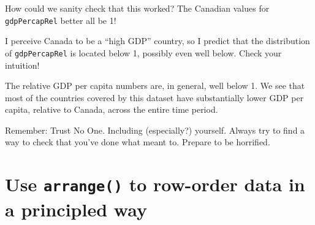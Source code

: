\documentclass[
]{book}
\newenvironment{Shaded}{\begin{snugshade}}{\end{snugshade}}
\newcommand{\CommentTok}[1]{\textcolor[rgb]{0.56,0.35,0.01}{\textit{#1}}}
\newcommand{\KeywordTok}[1]{\textcolor[rgb]{0.13,0.29,0.53}{\textbf{#1}}}
\newcommand{\NormalTok}[1]{#1}
\newcommand{\OperatorTok}[1]{\textcolor[rgb]{0.81,0.36,0.00}{\textbf{#1}}}
\newcommand{\StringTok}[1]{\textcolor[rgb]{0.31,0.60,0.02}{#1}}
\begin{document}
How could we sanity check that this worked? The Canadian values for \texttt{gdpPercapRel} better all be 1!

\begin{Shaded}
\end{Shaded}

I perceive Canada to be a ``high GDP'' country, so I predict that the distribution of \texttt{gdpPercapRel} is located below 1, possibly even well below. Check your intuition!

\begin{Shaded}
\end{Shaded}

The relative GDP per capita numbers are, in general, well below 1. We see that most of the countries covered by this dataset have substantially lower GDP per capita, relative to Canada, across the entire time period.

Remember: Trust No One. Including (especially?) yourself. Always try to find a way to check that you've done what meant to. Prepare to be horrified.

\hypertarget{use-arrange-to-row-order-data-in-a-principled-way}{%
\section{\texorpdfstring{Use \texttt{arrange()} to row-order data in a principled way}{Use arrange() to row-order data in a principled way}}\label{use-arrange-to-row-order-data-in-a-principled-way}}
\end{document}
